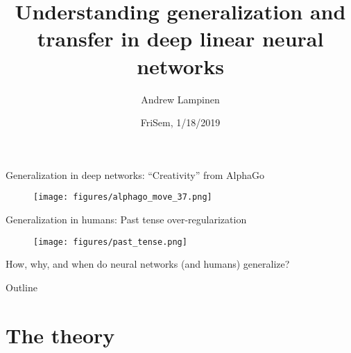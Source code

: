 \documentclass{beamer}
\begin{document}
\title{Understanding generalization and transfer in deep linear neural networks}
\author{Andrew Lampinen}
\date{FriSem, 1/18/2019}
\frame{\titlepage}

\begin{frame}{Generalization in deep networks: ``Creativity'' from AlphaGo}
\begin{figure}
\texttt{[image: figures/alphago\_move\_37.png]}
\end{figure}
\end{frame}

\begin{frame}{Generalization in humans: Past tense over-regularization}
\begin{figure}
\texttt{[image: figures/past\_tense.png]}
\end{figure}
\end{frame}

\begin{frame}[standout]
How, why, and when do neural networks (and humans) generalize?
\end{frame}

\begin{frame}{Outline}
\vspace{1em}
\tableofcontents
\end{frame}

\section{The theory}
\end{document}
